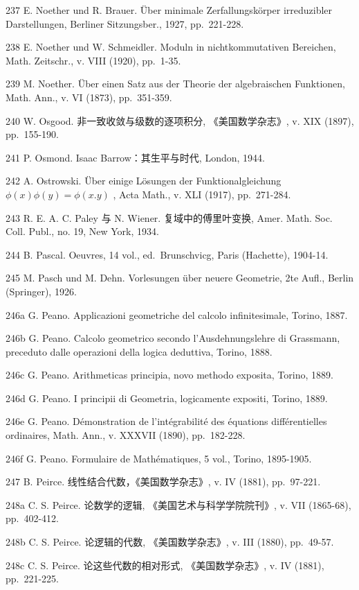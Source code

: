 237 E. Noether und R. Brauer. Über minimale Zerfallungskörper irreduzibler Darstellungen, Berliner Sitzungsber., 1927, pp.~221-228.

238 E. Noether und W. Schmeidler. Moduln in nichtkommutativen Bereichen, Math. Zeitschr., v. VIII (1920), pp.~1-35.

239 M. Noether. Über einen Satz aus der Theorie der algebraischen Funktionen, Math. Ann., v. VI (1873), pp.~351-359.

240 W. Osgood. 非一致收敛与级数的逐项积分, 《美国数学杂志》, v. XIX (1897), pp.~155-190.

241 P. Osmond. Isaac Barrow：其生平与时代, London, 1944.

242 A. Ostrowski. Über einige Lösungen der Funktionalgleichung \(\phi(x)\phi(y) = \phi(x.y)\) , Acta Math., v. XLI (1917), pp.~271-284.

243 R. E. A. C. Paley 与 N. Wiener. 复域中的傅里叶变换, Amer. Math. Soc. Coll. Publ., no. 19, New York, 1934.

244 B. Pascal. Oeuvres, 14 vol., ed.~Brunschvicg, Paris (Hachette), 1904-14.

245 M. Pasch und M. Dehn. Vorlesungen über neuere Geometrie, 2te Aufl., Berlin (Springer), 1926.

246a G. Peano. Applicazioni geometriche del calcolo infinitesimale, Torino, 1887.

246b G. Peano. Calcolo geometrico secondo l'Ausdehnungslehre di Grassmann, preceduto dalle operazioni della logica deduttiva, Torino, 1888.

246c G. Peano. Arithmeticas principia, novo methodo exposita, Torino, 1889.

246d G. Peano. I principii di Geometria, logicamente expositi, Torino, 1889.

246e G. Peano. Démonstration de l'intégrabilité des équations différentielles ordinaires, Math. Ann., v. XXXVII (1890), pp.~182-228.

246f G. Peano. Formulaire de Mathématiques, 5 vol., Torino, 1895-1905.

247 B. Peirce. 线性结合代数，《美国数学杂志》, v. IV (1881), pp.~97-221.

248a C. S. Peirce. 论数学的逻辑, 《美国艺术与科学学院院刊》, v. VII (1865-68), pp.~402-412.

248b C. S. Peirce. 论逻辑的代数, 《美国数学杂志》, v. III (1880), pp.~49-57.

248c C. S. Peirce. 论这些代数的相对形式, 《美国数学杂志》, v. IV (1881), pp.~221-225.


